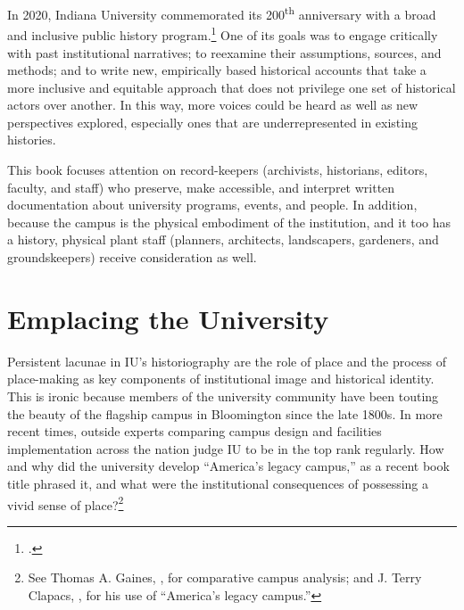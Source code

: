 \documentclass[
  american,
  letterpaper,
]{scrreprt}
\begin{document}
In 2020, Indiana University commemorated its 200\textsuperscript{th}
anniversary with a broad and inclusive public history
program.\footnote{.}
One of its goals was to engage critically with past institutional
narratives; to reexamine their assumptions, sources, and methods; and to
write new, empirically based historical accounts that take a more
inclusive and equitable approach that does not privilege one set of
historical actors over another. In this way, more voices could be heard
as well as new perspectives explored, especially ones that are
underrepresented in existing histories.

This book focuses attention on record-keepers (archivists, historians,
editors, faculty, and staff) who preserve, make accessible, and
interpret written documentation about university programs, events, and
people. In addition, because the campus is the physical embodiment of
the institution, and it too has a history, physical plant staff
(planners, architects, landscapers, gardeners, and groundskeepers)
receive consideration as well.

\section*{Emplacing the University}\label{emplacing-the-university}


Persistent lacunae in IU's historiography are the role of place and the
process of place-making as key components of institutional image and
historical identity. This is ironic because members of the university
community have been touting the beauty of the flagship campus in
Bloomington since the late 1800s. In more recent times, outside experts
comparing campus design and facilities implementation across the nation
judge IU to be in the top rank regularly. How and why did the university
develop ``America's legacy campus,'' as a recent book title phrased it,
and what were the institutional consequences of possessing a vivid sense
of place?\footnote{See Thomas A. Gaines,
  , for comparative campus analysis; and
  J. Terry Clapacs, , for his use of ``America's legacy campus.''}
\end{document}
